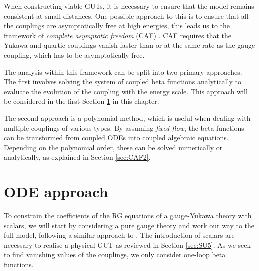 When constructing viable GUTs, it is necessary to ensure that the model remains consistent at small distances. One possible approach to this is to ensure that all the couplings are asymptotically free at high energies, this leads us to the framework of \textit{complete asymptotic freedom} (CAF) \cite{Giudice:2014tma, Pica:2016krb}. CAF requires that the Yukawa and quartic couplings vanish faster than or at the same rate as the gauge coupling, which has to be asymptotically free. 

The analysis within this framework can be split into two primary approaches. The first involves solving the system of coupled beta functions analytically to evaluate the evolution of the coupling with the energy scale. This approach will be considered in the first Section \ref{sec:CAFODE} in this chapter.

The second approach is a polynomial method, which is useful when dealing with multiple couplings of various types. By assuming \textit{fixed flow}, the beta functions can be transformed from coupled ODEs into coupled algebraic equations. Depending on the polynomial order, these can be solved numerically or analytically, as explained in Section \ref{sec:CAF2}. 

\section{ODE approach}\label{sec:CAFODE}
To constrain the coefficients of the RG equations of a gauge-Yukawa theory with scalars, we will start by considering a pure gauge theory and work our way to the full model, following a similar approach to \cite{Giudice:2014tma, Pica:2016krb}. The introduction of scalars are necessary to realise a physical GUT as reviewed in Section \ref{sec:SU5}. As we seek to find vanishing values of the couplings, we only consider one-loop beta functions. 
